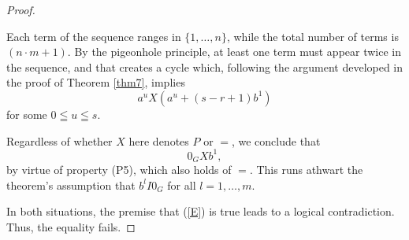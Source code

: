 \documentclass[pdflatex,sn-apa,11pt]{sn-jnl}%
\begin{document}
\begin{proof}
\begin{itemize}
Each term of the sequence ranges in $\{1, \dots, n\}$, while the total number of terms is $(n \cdot m +1)$. By the pigeonhole principle, at least one term must appear twice in the sequence, and that creates a cycle which, following the argument developed in the proof of Theorem \ref{thm7}, implies \begin{equation*}a^uX(a^{u} + (s-r+1)b^1)\end{equation*}
for some $0 \leqq u \leqq s$. 

Regardless of whether $X$ here denotes $P$ or $=$, we conclude that \begin{equation*}0_GXb^1,\end{equation*}
by virtue of property (P5), which also holds of $=$. This runs athwart the theorem's assumption that $b^lI0_G$ for all $l = 1, \dots, m$. %
\end{itemize}
In both situations, the premise that (\ref{E}) is true leads to a logical contradiction. Thus, the equality fails.



\end{proof}
\end{document}
